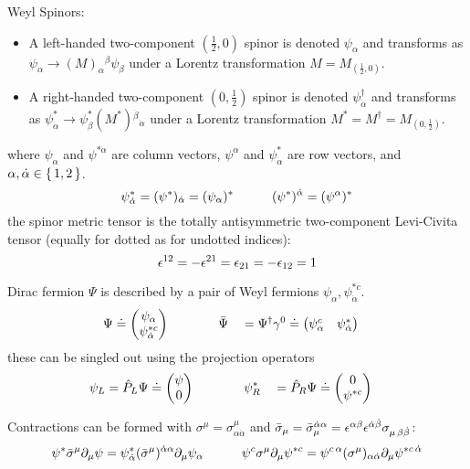 			\noindent
			Weyl Spinors:
			\begin{itemize}
				\item A left-handed two-component $(\frac{1}{2},0)$ spinor is denoted $\psi_{\alpha}$ and transforms as $\psi_{\alpha} \to (M)_{\alpha}{}^{\beta} \psi_{\beta}$ under a Lorentz transformation $M=M_{(\frac{1}{2},0)}$.
				\item A right-handed two-component $(0,\frac{1}{2})$ spinor is denoted $\psi_{\dot{\alpha}}^\dagger$ and transforms as $\psi_{\dot{\alpha}}^{*} \to \psi_{\dot{\beta}}^{*} (M^{*}){}^{\dot{\beta}}{}_{\dot{\alpha}}$ under a Lorentz transformation $M^{*}=M^\dagger =M_{(0,\frac{1}{2})}$.
			\end{itemize}
			where $\psi_\alpha$ and $\psi^{{*}\dot{\alpha}}$ are column vectors, $\psi^\alpha$ and $\psi^{*}_{\dot{\alpha}}$ are row vectors, and $\alpha,\dot{\alpha}\in\set{1,2}$.
			\begin{equation}
				\psi^{*}_{\dot{\alpha}} = (\psi^{*})_{\dot{\alpha}} = (\psi_\alpha)^{*}
				\hspace{30pt}
				(\psi^{*})^{\dot{\alpha}} = (\psi^\alpha)^{*}
			\end{equation}
			the spinor metric tensor is the totally antisymmetric two-component Levi-Civita tensor (equally for dotted as for undotted indices):
			\begin{equation}
				\epsilon^{12} = - \epsilon^{21} = \epsilon_{21} = - \epsilon_{12} = 1
			\end{equation}

			\noindent
			Dirac fermion $\Psi$ is described by a pair of Weyl fermions $\psi_{\alpha}, \psi^{*c}_{\dot{\alpha}}$.
			\begin{alignat}{3}
				\Psi &\doteq \mqty(\psi_{\alpha} \\ \psi^{*c}_{\dot{\alpha}})
				\hsp &&
				\bar{\Psi} &&= \Psi^\dagger\gamma^0 \doteq \mqty(\psi^c_{\alpha} & \psi^{*}_{\dot{\alpha}})
			\end{alignat}
			these can be singled out using the projection operators
			\begin{alignat}{3}
				\psi_L &= \hat{P}_L \Psi \doteq \mqty(\psi \\ 0)
				\hsp &&
				\psi_R^{*} &&= \hat{P}_R \Psi \doteq \mqty(0 \\ \psi^{*c})
			\end{alignat}

			\noindent
			Contractions can be formed with $\sigma^\mu=\sigma^\mu_{\alpha\dot{\alpha}}$ and $\bar{\sigma}_\mu=\bar{\sigma}_\mu^{\dot{\alpha}\alpha} = \epsilon^{\alpha\beta}\epsilon^{\dot{\alpha}\dot{\beta}}\sigma_{\mu\,\beta\dot{\beta}}$:
			\begin{equation}
				\psi^{*} \bar{\sigma}^\mu \partial_\mu \psi = \psi^{*}_{\dot{\alpha}} (\bar{\sigma}^\mu)^{\dot{\alpha}\alpha}\partial_\mu \psi_{\alpha}
				\hspace{30pt} \psi^c \sigma^\mu \partial_\mu \psi^{*c} = \psi^{c\,\alpha} (\sigma^\mu)_{\alpha\dot{\alpha}}\partial_\mu \psi^{*c\,\dot{\alpha}}
			\end{equation}

